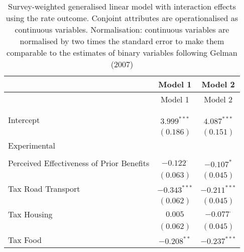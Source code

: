 
\begin{center}
\begin{tiny}
\begin{longtable}{l@{} c@{} c@{}}
\hline
 & Model 1 & Model 2 \\
\hline
\endfirsthead
\hline
 & Model 1 & Model 2 \\
\hline
\endhead
\hline
\endfoot
\hline
\multicolumn{3}{l}{\tiny{$^{***}p<0.001$; $^{**}p<0.01$; $^{*}p<0.05$; $^{\cdot}p<0.1$}}\\
\caption{Survey-weighted generalised linear model with interaction effects using the rate outcome. Conjoint attributes are operationalised as continuous variables. Normalisation: continuous variables are normalised by two times 
               the standard error to make them comparable to the estimates of binary variables following Gelman (2007)}
\label{table:weighted_interactions_exp_continous}
\endlastfoot \\
Intercept                                                                   & $3.999^{***}$    & $4.087^{***}$    \\
                                                                            & $(0.186)$        & $(0.151)$        \\
Experimental                                                                &                  &                  \\
                                                                            &                  &                  \\
\quad Perceived Effectiveness of Prior Benefits                             & $-0.122^{\cdot}$ & $-0.107^{*}$     \\
                                                                            & $(0.063)$        & $(0.045)$        \\
\quad Tax Road Transport                                                    & $-0.343^{***}$   & $-0.211^{***}$   \\
                                                                            & $(0.062)$        & $(0.045)$        \\
\quad Tax Housing                                                           & $0.005$          & $-0.077^{\cdot}$ \\
                                                                            & $(0.062)$        & $(0.045)$        \\
\quad Tax Food                                                              & $-0.208^{**}$    & $-0.237^{***}$   \\

\end{longtable}
\end{tiny}
\end{center}
